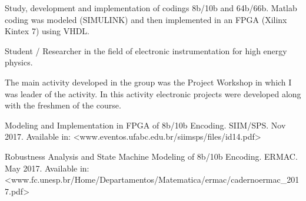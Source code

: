 \documentclass[10pt,a4paper,ragged2e]{altacv}
\begin{document}
Study, development and implementation of codings 8b/10b and 64b/66b. Matlab coding was modeled (SIMULINK) and then implemented in an FPGA (Xilinx Kintex 7) using VHDL. 

\divider

Student / Researcher in the field of electronic instrumentation for high energy physics.

\divider

The main activity developed in the group was the Project Workshop in which I was leader of the activity. In this activity electronic projects were developed along with the freshmen of the course.

\medskip




\nocite{*}

\printbibliography[heading=pubtype,title={\printinfo{\faBook}{Books}},type=book]


\printbibliography[heading=pubtype,title={\printinfo{\faFileTextO}{Artigos}}, type=article]
Modeling and Implementation in FPGA of 8b/10b Encoding. SIIM/SPS. Nov 2017. Available in: <www.eventos.ufabc.edu.br/siimsps/files/id14.pdf>

\divider

Robustness Analysis and State Machine Modeling of 8b/10b Encoding. ERMAC. May 2017. Available in: <www.fc.unesp.br/Home/Departamentos/Matematica/ermac/caderno\-ermac\_2017.pdf>

\printbibliography[heading=pubtype,title={\printinfo{\faGroup}{Conference Proceedings}},type=inproceedings]

\end{document}
